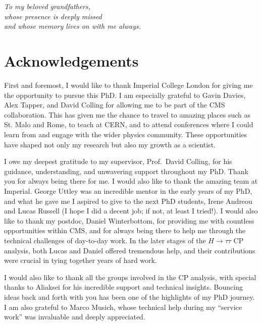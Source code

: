 \documentclass[12pt, a4paper, twoside]{report}
\begin{document}
\chapter*{}
\begin{center}
\vspace*{5cm}
\emph{To my beloved grandfathers,\\
whose presence is deeply missed\\
and whose memory lives on with me always.}
\end{center}

\chapter*{Acknowledgements}

First and foremost, I would like to thank Imperial College London for giving me the opportunity to pursue this PhD. I am especially grateful to Gavin Davies, Alex Tapper, and David Colling for allowing me to be part of the CMS collaboration. This has given me the chance to travel to amazing places such as St. Malo and Rome, to teach at CERN, and to attend conferences where I could learn from and engage with the wider physics community. These opportunities have shaped not only my research but also my growth as a scientist.  

I owe my deepest gratitude to my supervisor, Prof.~David Colling, for his guidance, understanding, and unwavering support throughout my PhD. Thank you for always being there for me. I would also like to thank the amazing team at Imperial. George Uttley was an incredible mentor in the early years of my PhD, and what he gave me I aspired to give to the next PhD students, Irene Andreou and Lucas Russell (I hope I did a decent job; if not, at least I tried!). I would also like to thank my postdoc, Daniel Winterbottom, for providing me with countless opportunities within CMS, and for always being there to help me through the technical challenges of day-to-day work. In the later stages of the $H \to \tau\tau$ CP analysis, both Lucas and Daniel offered tremendous help, and their contributions were crucial in tying together years of hard work.  

I would also like to thank all the groups involved in the CP analysis, with special thanks to Aliaksei for his incredible support and technical insights. Bouncing ideas back and forth with you has been one of the highlights of my PhD journey. I am also grateful to Marco Musich, whose technical help during my ``service work'' was invaluable and deeply appreciated.  
\end{document}
